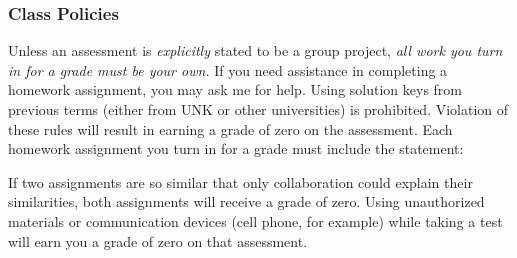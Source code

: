 \documentclass[12pt]{article}
\newcounter{ex}\setcounter{ex}{0}
\begin{document}
\subsubsection* {Class Policies}

Unless an assessment is \emph{explicitly} stated to be a group project,  \emph{all work you turn in for a grade must be your own.}  If you need assistance in completing a homework assignment, you may ask me for help. Using solution keys from previous terms (either from UNK or other universities) is prohibited.  Violation of these rules will result in earning a grade of zero on the assessment. Each homework assignment you turn in for a grade must include the statement:

\begin{quote}
\end{quote}
 If two assignments are so similar that only collaboration could explain their similarities, both assignments will receive a grade of zero.  Using unauthorized materials or communication devices (cell phone, for
example) while taking a test will earn you a grade of zero on that assessment.  

 
\end{document}
